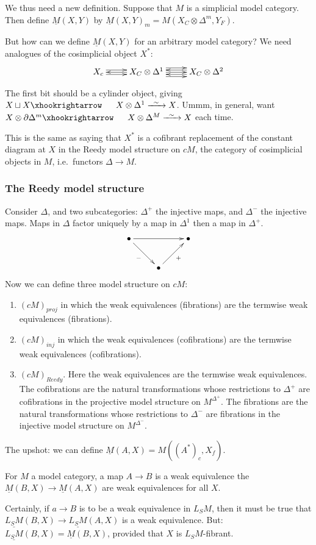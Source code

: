 \documentclass[11pt]{article}
\begin{document}
\begin{AlexandreBousfieldLocalisation}
\begin{PartOne}
We thus need a new definition. Suppose that $M$ is a simplicial model category. Then define $\underline M(X,Y)$ by $\underline M(X,Y)_m=M(X_C\otimes\Delta^m,Y_F)$. 

But how can we define $\underline M(X,Y)$ for an arbitrary model category? We need analogues of the cosimplicial object $X^*$:
\[\xymatrix{X_c\ar@<.6ex>[r]\ar@<-.6ex>[r]&\ar[l] X_C\otimes\Delta^1
\ar[r]\ar@<1.2ex>[r]\ar@<-1.2ex>[r]&
\ar@<.6ex>[l]\ar@<-.6ex>[l]X_C\otimes\Delta^2
}\]

The first bit should be a cylinder object, giving $X\sqcup X\cofibration X\otimes \Delta^1\weakequiv X$. Ummm, in general, want $X\otimes\partial \Delta^m\cofibration X\otimes\Delta^M\weakequiv X$ each time.

This is the same as saying that $X^*$ is a cofibrant replacement of the constant diagram at $X$ in the Reedy model structure on $cM$, the category of cosimplicial objects in $M$, i.e.\ functors $\Delta\to M$.
\subsubsection*{The Reedy model structure}
Consider $\Delta$, and two subcategories: $\Delta^+$ the injective maps, and $\Delta^-$ the injective maps. Maps in $\Delta$ factor uniquely by a map in $\Delta^1$ then a map in $\Delta^+$.
\[\xymatrix{
\Bullet\ar[rr]\ar[rd]_{-}&&\Bullet\\
&\Bullet\ar[ru]_{+}
}\]
Now we can define three model structure on $cM$:
\begin{enumerate}
\item $(cM)_{proj}$ in which the weak equivalences (fibrations) are the termwise weak equivalences (fibrations).
\item $(cM)_{inj}$ in which the weak equivalences (cofibrations) are the termwise weak equivalences (cofibrations).
\item $(cM)_{Reedy}$. Here the weak equivalences are the termwise weak equivalences. The cofibrations are the natural transformations whose restrictions to $\Delta^+$ are cofibrations in the projective model structure on $M^{\Delta^+}$. The fibrations are the natural transformations whose restrictions to $\Delta^-$ are fibrations in the injective model structure on $M^{\Delta^-}$. 
\end{enumerate}
\end{PartOne}
\begin{PartTwo}
The upshot: we can define $\underline M(A,X)=M((A^*)_c,X_f)$.
\begin{prop*}
For $M$ a model category, a map $A\to B$ is a weak equivalence \Iff the $\underline M(B,X)\to\underline M(A,X)$ are weak equivalences for all $X$.
\end{prop*}
Certainly, if $a\to B$ is to be a weak equivalence in $L_SM$, then it must be true that $\underline{L_SM}(B,X)\to\underline{L_SM}(A,X)$ is a weak equivalence. But:
$\underline{L_SM}(B,X)=\underline M(B,X)$, provided that $X$ is $L_SM$-fibrant.

\end{PartTwo}
\end{AlexandreBousfieldLocalisation}
\end{document}
